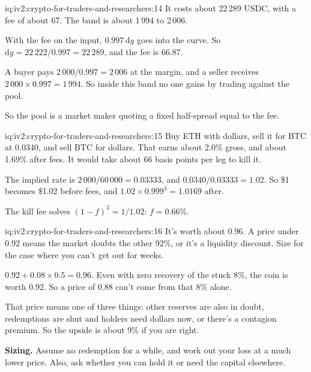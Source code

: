 \begin{solution}{iq:iv2:crypto-for-traders-and-researchers:14}
It costs about 22\,289 USDC, with a fee of about 67. The band is about 1\,994 to 2\,006.

With the fee on the input, $0.997\,\mathrm{d}y$ goes into the curve. So $\mathrm{d}y = 22\,222/0.997 = 22\,289$, and the fee is 66.87.

A buyer pays $2\,000/0.997 = 2\,006$ at the margin, and a seller receives $2\,000 \times 0.997 = 1\,994$. So inside this band no one gains by trading against the pool.

So the pool is a market maker quoting a fixed half-spread equal to the fee.

\end{solution}

\begin{solution}{iq:iv2:crypto-for-traders-and-researchers:15}
Buy ETH with dollars, sell it for BTC at 0.0340, and sell BTC for dollars. That earns about 2.0\% gross, and about 1.69\% after fees. It would take about 66 basis points per leg to kill it.

The implied rate is $2\,000/60\,000 = 0.03333$, and $0.0340/0.03333 = 1.02$. So \$1 becomes \$1.02 before fees, and $1.02 \times 0.999^3 = 1.0169$ after.

The kill fee solves $(1 - f)^3 = 1/1.02$: $f = 0.66\%$.

\end{solution}

\begin{solution}{iq:iv2:crypto-for-traders-and-researchers:16}
It's worth about 0.96. A price under 0.92 means the market doubts the other 92\%, or it's a liquidity discount. Size for the case where you can't get out for weeks.

$0.92 + 0.08 \times 0.5 = 0.96$. Even with zero recovery of the stuck 8\%, the coin is worth 0.92. So a price of 0.88 can't come from that 8\% alone.

That price means one of three things: other reserves are also in doubt, redemptions are shut and holders need dollars now, or there's a contagion premium. So the upside is about 9\% if you are right.

\textbf{Sizing.} Assume no redemption for a while, and work out your loss at a much lower price. Also, ask whether you can hold it or need the capital elsewhere.

\end{solution}

